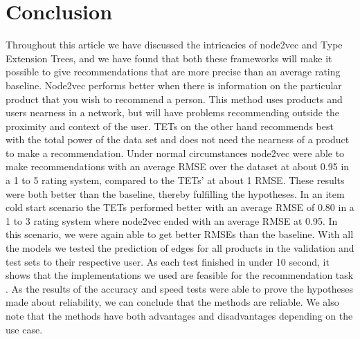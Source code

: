 \section{Conclusion}
Throughout this article we have discussed the intricacies of node2vec and Type Extension Trees, and we have found that both these frameworks will make it possible to give recommendations that are more precise than an average rating baseline.
Node2vec performs better when there is information on the particular product that you wish to recommend a person.
This method uses products and users nearness in a network, but will have problems recommending outside the proximity and context of the user.
TETs on the other hand recommends best with the total power of the data set and does not need the nearness of a product to make a recommendation.
Under normal circumstances node2vec were able to make recommendations with an average RMSE over the dataset at about 0.95 in a 1 to 5 rating system, compared to the TETs' at about 1 RMSE.
These results were both better than the baseline, thereby fulfilling the hypotheses.
In an item cold start scenario the TETs performed better with an average RMSE of 0.80 in a 1 to 3 rating system where node2vec ended with an average RMSE at 0.95.
In this scenario, we were again able to get better RMSEs than the baseline.
With all the models we tested  the prediction of edges for all products in the validation and test sets to their respective user.
As each test finished in under 10 second, it shows that the implementations we used are feasible for the recommendation task .
As the results of the accuracy and speed tests were able to prove the hypotheses made about reliability, we can conclude that the methods are reliable.
We also note that the methods have both advantages and disadvantages depending on the use case. 
